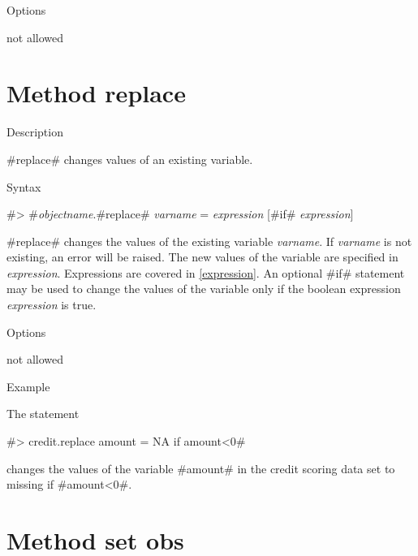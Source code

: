 \begin{stanza}{Options}

not allowed

\end{stanza}

\clearpage



\section{Method replace}
\label{replace} 



\begin{stanza}{Description}

{#replace# changes values of an existing variable.}
\end{stanza}


\begin{stanza}{Syntax}

 #> #{\em objectname}.#replace# {\em varname} = {\em expression} [#if# {\em expression}]

#replace# changes the values of the existing variable {\em
varname}. If {\em varname} is not existing, an error will be
raised. The new values of the variable are specified in {\em
expression}. Expressions are covered in \autoref{expression}. An
optional #if# statement may be used to change the values of the
variable only if the boolean expression {\em expression} is true.
\end{stanza}


\begin{stanza}{Options}

{not allowed}
\end{stanza}


\begin{stanza}{Example}

{The statement

#> credit.replace amount = NA if amount<0#

changes the values of the variable #amount# in the credit scoring
data set to missing if #amount<0#.}
\end{stanza}



\clearpage



\section{Method set obs}
\label{setobs}


